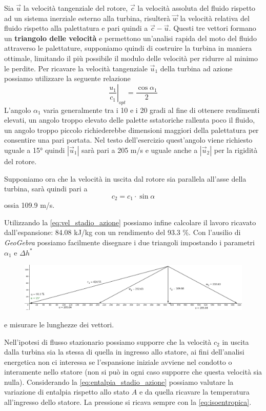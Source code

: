 \documentclass[a4paper,12pt]{article}
\begin{document}
Sia $\vec u$ la velocità tangenziale del rotore, $\vec c$ la velocità assoluta del fluido rispetto ad un sistema inerziale esterno alla turbina,
risulterà $\vec w$ la velocità relativa del fluido rispetto alla palettatura e pari quindi a  $\vec c - \vec u$.
Questi tre vettori formano un \textbf{triangolo delle velocità} e permettono un'analisi rapida del moto del fluido attraverso le palettature,
supponiamo quindi di costruire la turbina in maniera ottimale, limitando il più possibile il modulo delle velocità per ridurre al minimo le perdite.
Per ricavare la velocità tangenziale $\vec u_1$ della turbina ad azione possiamo utilizzare la seguente relazione
\begin{equation}
    \left.\frac{u_1}{c_1}\right|_{opt} = \frac{\cos \alpha_1}{2}
\end{equation}
L'angolo $\alpha_1$ varia generalmente tra i 10 e i 20 gradi al fine di ottenere rendimenti elevati, un angolo troppo elevato delle palette sstatoriche rallenta poco 
il fluido, un angolo troppo piccolo richiederebbe dimensioni maggiori della palettatura per consentire una pari portata.
Nel testo dell'esercizio quest'angolo viene richiesto uguale a 15° quindi $|\vec u_1|$ sarà pari a 205 m/s e uguale anche a $|\vec u_2|$ per la rigidità
del rotore.

Supponiamo ora che la velocità in uscita dal rotore sia parallela all'asse della turbina, sarà quindi pari a
\begin{equation}
    c_2 = c_1 \cdot \sin \alpha
\end{equation}
ossia 109.9 m/s.

Utilizzando la \eqref{eq:vel_stadio_azione} possiamo infine calcolare il lavoro ricavato dall'espansione: 84.08 kJ/kg con un rendimento del 93.3 \%.
Con l'ausilio di \textit{GeoGebra} possiamo facilmente disegnare i due triangoli impostando i parametri $\alpha_1$ e $\Delta h^*$
\begin{figure}[H]
    \label{fig:triangoli_azione}
    \centering
    \includegraphics[width=\linewidth]{media/triangoli_azione.png}
\end{figure}
e misurare le lunghezze dei vettori.

Nell'ipotesi di flusso stazionario possiamo supporre che la velocità $c_2$ in uscita dalla turbina sia la stessa di quella in ingresso allo statore,
ai fini dell'analisi energetica non ci interessa se l'espansione iniziale avviene nel condotto o interamente nello statore (non si può in ogni caso supporre che questa
velocità sia nulla).
Considerando la \eqref{eq:entalpia_stadio_azione} possiamo valutare la variazione di entalpia rispetto allo stato $A$ e da quella ricavare la temperatura all'ingresso
dello statore. La pressione si ricava sempre con la \eqref{eq:isoentropica}.
\end{document}
